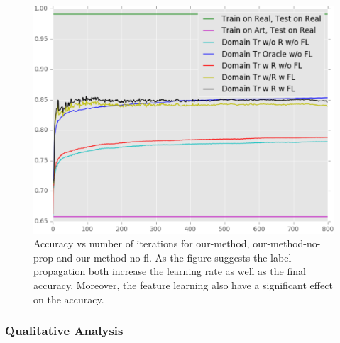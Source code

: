 \begin{figure}[ht]
\includegraphics[width=\columnwidth]{figure_1fl}
\caption{Accuracy vs number of iterations for our-method, our-method-no-prop and our-method-no-fl. As the figure suggests the label propagation both increase the learning rate as well as the final accuracy. Moreover, the feature learning also have a significant effect on the accuracy.}
\label{fllprop}
\end{figure}

\subsubsection{Qualitative Analysis}


